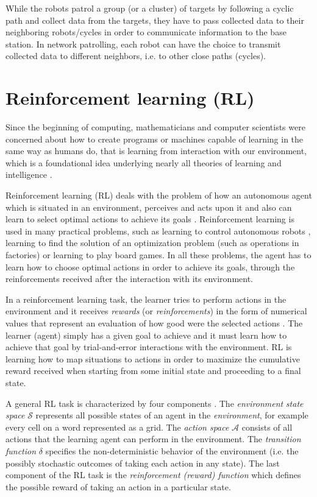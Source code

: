 While the robots patrol a group (or a cluster) of targets by following a cyclic path and collect data from the targets, they have to pass collected data to their neighboring robots/cycles in order to communicate information to the base station. In network patrolling, each robot can have the choice to transmit collected data to different neighbors, i.e. to other close paths (cycles). 

\section{Reinforcement learning (RL)}

Since the beginning of computing, mathematicians and computer scientists were concerned about how to create programs or machines capable of learning in the same way as humans do, that is learning from interaction with our environment, which is a foundational idea underlying nearly all theories of learning and intelligence \cite{rsab} .
 \par Reinforcement learning (RL) deals with the problem of how an autonomous agent which is situated in an environment, perceives and acts upon it and also can learn to select optimal actions to achieve its goals \cite{mitchell}. Reinforcement learning is used in many practical problems, such as learning to control autonomous robots \cite{konidaris}, learning to find the solution of an optimization problem (such as operations in factories) or learning to play board games. In all these problems, the agent has to learn how to choose optimal actions in order to achieve its goals, through the reinforcements received after the interaction with its environment. 

In a reinforcement learning task, the learner tries to perform actions in the environment and it receives \emph{rewards} (or \emph{reinforcements}) in the form of numerical values that represent an evaluation of how good were the selected actions \cite{uribe}. The learner (agent) simply has a given goal to achieve and it must learn how to achieve that goal by trial-and-error interactions with the environment. RL is learning  how to map situations to actions in order to maximize the cumulative reward received when starting from some initial state and proceeding to a final state.  

A general RL task is characterized by four components \cite{rsab}. The \emph{environment} \emph{state space} $\mathcal{S}$  represents all possible states of an agent in the \emph{environment}, for example every cell on a word represented as a grid. The \emph{action space} $\mathcal{A}$ consists of all  actions that the learning agent can perform in the environment. The \emph{transition function} $\delta$ specifies the non-deterministic behavior of the environment (i.e. the possibly stochastic outcomes of taking each action in any state). The last component of the RL task is the \emph{reinforcement (reward)  function} which defines the possible reward of taking an action in a particular state.

